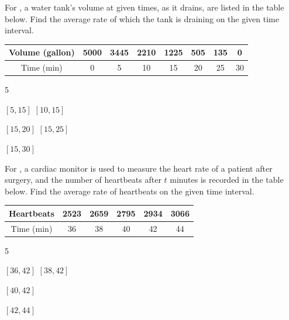 \documentclass{book}
\begin{document}
\vfill
{}
\pagebreak

For , a water tank's volume at given times, as it drains, are listed in the table below. Find the average rate of which the tank is draining on the given time interval.
\begin{center}
        \begin{tabular}{|c|c|c|c|c|c|c|c|}\hline
    Volume (gallon) & 5000     & 3445    & 2210    & 1225    & 505 & 135 & 0 \\ \hline
    Time (min) & 0     & 5     & 10    & 15    & 20 & 25 & 30 \\ \hline
    \end{tabular}
\end{center}
\begin{enumerate}[!HW!]
\begin{multicols}{5}
\item\label{exer:tankrate:start} $[5,15]$
\itemspade $[10,15]$ 
\item $[15,20]$ 
\itemspade $[15,25]$ 
\item\label{exer:tankrate:stop} $[15,30]$ 
\end{multicols}
\end{enumerate}

For , a cardiac monitor is used to measure the heart rate of a patient after surgery, and the number of heartbeats after $t$ minutes is recorded in the table below.  Find the average rate of heartbeats on the given time interval.
\begin{center}
        \begin{tabular}{|c|c|c|c|c|c|}\hline
    Heartbeats & 2523     & 2659    & 2795    & 2934    & 3066 \\ \hline
    Time (min) & 36     & 38     & 40    & 42    & 44\\ \hline
    \end{tabular}
\end{center}
\begin{enumerate}[!HW!]
\begin{multicols}{5}
\item\label{exer:heartmonitor:start} $[36,42]$ 
\itemspade $[38,42]$ 
\item $[40,42]$
\item\label{exer:heartmonitor:stop} $[42,44]$ 
\end{multicols}
\end{enumerate}
\end{document}

